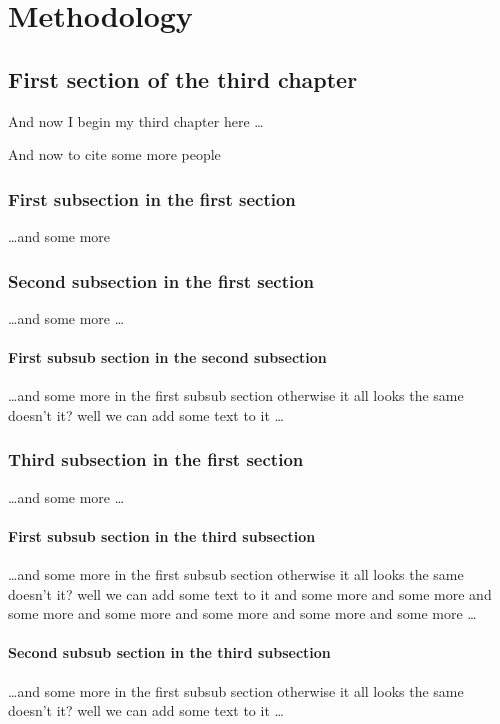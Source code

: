 \chapter{Methodology}

\ifpdf
    \graphicspath{{Chapter3/Figs/Raster/}{Chapter3/Figs/PDF/}{Chapter3/Figs/}}
\else
    \graphicspath{{Chapter3/Figs/Vector/}{Chapter3/Figs/}}
\fi

\section{First section of the third chapter}
And now I begin my third chapter here \dots

And now to cite some more people~\cite{Rea85,Ancey1996}

\subsection{First subsection in the first section}
\dots and some more 

\subsection{Second subsection in the first section}
\dots and some more \dots

\subsubsection{First subsub section in the second subsection}
\dots and some more in the first subsub section otherwise it all looks the same
doesn't it? well we can add some text to it \dots

\subsection{Third subsection in the first section}
\dots and some more \dots

\subsubsection{First subsub section in the third subsection}
\dots and some more in the first subsub section otherwise it all looks the same
doesn't it? well we can add some text to it and some more and some more and
some more and some more and some more and some more and some more \dots

\subsubsection{Second subsub section in the third subsection}
\dots and some more in the first subsub section otherwise it all looks the same
doesn't it? well we can add some text to it \dots

